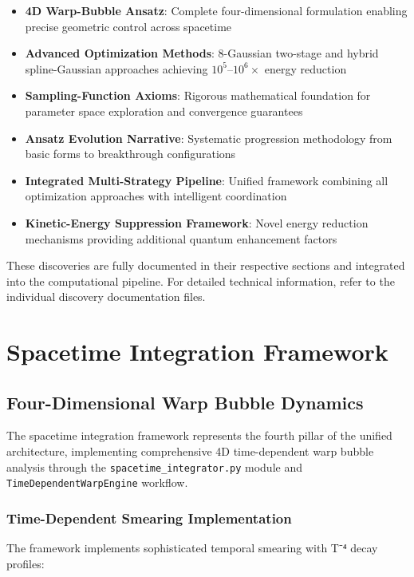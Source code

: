 \documentclass[12pt]{article}
\begin{document}
\begin{itemize}
\item \textbf{4D Warp-Bubble Ansatz}: Complete four-dimensional formulation enabling precise geometric control across spacetime
\item \textbf{Advanced Optimization Methods}: 8-Gaussian two-stage and hybrid spline-Gaussian approaches achieving $10^5$--$10^6\times$ energy reduction
\item \textbf{Sampling-Function Axioms}: Rigorous mathematical foundation for parameter space exploration and convergence guarantees
\item \textbf{Ansatz Evolution Narrative}: Systematic progression methodology from basic forms to breakthrough configurations
\item \textbf{Integrated Multi-Strategy Pipeline}: Unified framework combining all optimization approaches with intelligent coordination
\item \textbf{Kinetic-Energy Suppression Framework}: Novel energy reduction mechanisms providing additional quantum enhancement factors
\end{itemize}

These discoveries are fully documented in their respective sections and integrated into the computational pipeline. For detailed technical information, refer to the individual discovery documentation files.

\section{Spacetime Integration Framework}

\subsection{Four-Dimensional Warp Bubble Dynamics}

The spacetime integration framework represents the fourth pillar of the unified architecture, implementing comprehensive 4D time-dependent warp bubble analysis through the \texttt{spacetime_integrator.py} module and \texttt{TimeDependentWarpEngine} workflow.

\subsubsection{Time-Dependent Smearing Implementation}

The framework implements sophisticated temporal smearing with T⁻⁴ decay profiles:
\end{document}
